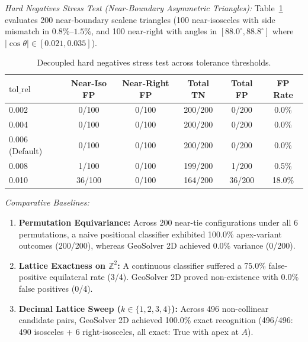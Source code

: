 \documentclass[preprint,12pt]{elsarticle}
\begin{document}
\textit{Hard Negatives Stress Test (Near-Boundary Asymmetric Triangles):} Table~\ref{tab:hard_negatives} evaluates 200 near-boundary scalene triangles (100 near-isosceles with side mismatch in $0.8\%–1.5\%$, and 100 near-right with angles in $[88.0^\circ, 88.8^\circ]$ where $|\cos \theta| \in [0.021, 0.035]$).

\begin{table}[h!]
\centering
\small
\begin{tabular}{lccccc}
\toprule
$\text{tol\_rel}$ & \textbf{Near-Iso FP} & \textbf{Near-Right FP} & \textbf{Total TN} & \textbf{Total FP} & \textbf{FP Rate} \\
\midrule
0.002 & 0/100 & 0/100 & 200/200 & 0/200 & 0.0\% \\
0.004 & 0/100 & 0/100 & 200/200 & 0/200 & 0.0\% \\
0.006 (Default) & 0/100 & 0/100 & 200/200 & 0/200 & 0.0\% \\
0.008 & 1/100 & 0/100 & 199/200 & 1/200 & 0.5\% \\
0.010 & 36/100 & 0/100 & 164/200 & 36/200 & 18.0\% \\
\bottomrule
\end{tabular}
\caption{Decoupled hard negatives stress test across tolerance thresholds.}
\label{tab:hard_negatives}
\end{table}

\textit{Comparative Baselines:}
\begin{enumerate}
    \item \textbf{Permutation Equivariance:} Across 200 near-tie configurations under all 6 permutations, a naive positional classifier exhibited 100.0\% apex-variant outcomes (200/200), whereas GeoSolver 2D achieved 0.0\% variance (0/200).
    \item \textbf{Lattice Exactness on $\mathbb{Z}^2$:} A continuous classifier suffered a 75.0\% false-positive equilateral rate (3/4). GeoSolver 2D proved non-existence with 0.0\% false positives (0/4).
    \item \textbf{Decimal Lattice Sweep ($k \in \{1, 2, 3, 4\}$):} Across 496 non-collinear candidate pairs, GeoSolver 2D achieved 100.0\% exact recognition (496/496: 490 isosceles + 6 right-isosceles, all exact: True with apex at $A$).
\end{enumerate}
\end{document}
